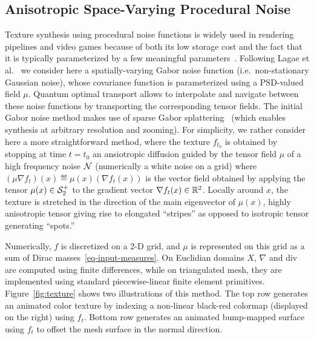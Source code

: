 
\subsection{Anisotropic Space-Varying Procedural Noise}




Texture synthesis using procedural noise functions is widely used in rendering pipelines and video games because of both its low storage cost and the fact that it is typically parameterized by a few meaningful parameters~\cite{LagaeSurvey}. 
%
Following Lagae et al.~ we consider here a spatially-varying Gabor noise function (i.e.\ non-stationary Gaussian noise), whose covariance function is parameterized using a PSD-valued field $\mu$. 
%
Quantum optimal transport allows to interpolate and navigate between these noise functions by transporting the corresponding tensor fields. 
%
The initial Gabor noise method makes use of sparse Gabor splattering~\cite{LagaeSurvey} (which enables synthesis at arbitrary resolution and zooming). For simplicity, we rather consider here a more straightforward method, where the texture $f_{t_0}$ is obtained by stopping at time $t=t_0$ an ansiotropic diffusion guided by the tensor field $\mu$  of a high frequency noise $\mathcal{N}$ (numerically a white noise on a grid)
where $(\mu \nabla f_t)(x) \eqdef \mu(x) (\nabla f_t(x))$ is the vector field obtained by applying the tensor $\mu(x) \in \mathcal{S}_2^+$ to the gradient vector $\nabla f_t(x) \in \mathbb{R}^2$. 
%
Locally around $x$, the texture is stretched in the direction of the main eigenvector of $\mu(x)$,  highly anisotropic tensor giving rise to elongated ``stripes'' as opposed to isotropic tensor generating ``spots.''

Numerically, $f$ is discretized on a 2-D grid, and $\mu$ is represented on this grid as a sum of Dirac masses~\eqref{eq-input-measures}. On Euclidian domains $X$, $\nabla$ and div are computed using finite differences, while on triangulated mesh, they are implemented using standard piecewise-linear finite element primitives. 
%
Figure~\ref{fig:texture} shows two illustrations of this method. The top row generates an animated color texture by indexing a non-linear black-red colormap (displayed on the right) using $f_t$. Bottom row generates an animated bump-mapped surface using $f_t$ to offset the mesh surface in the normal direction. 


